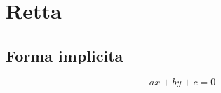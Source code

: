 \documentclass{article}
\begin{document}
  \section{Retta}

  \subsection*{Forma implicita}
  \begin{equation}
    ax+by+c = 0
  \end{equation}
\end{document}
